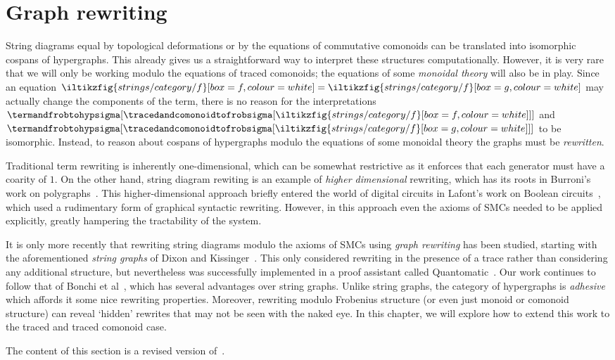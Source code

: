 \chapter{Graph rewriting}\label{chap:rewriting}

String diagrams equal by topological deformations or by the equations of
commutative comonoids can be translated into isomorphic cospans of hypergraphs.
This already gives us a straightforward way to interpret these structures
computationally.
However, it is very rare that we will only be working modulo the equations of
traced comonoids; the equations of some \emph{monoidal theory} will also be in
play.
Since an equation \(
\iltikzfig{strings/category/f}[box=f,colour=white]
=
\iltikzfig{strings/category/f}[box=g,colour=white]
\) may actually change the components of the term, there is no reason for the
interpretations \(
\termandfrobtohypsigma[
    \tracedandcomonoidtofrobsigma[
        \iltikzfig{strings/category/f}[box=f,colour=white]
    ]
]
\) and \(
\termandfrobtohypsigma[
    \tracedandcomonoidtofrobsigma[
        \iltikzfig{strings/category/f}[box=g,colour=white]
    ]
]
\) to be isomorphic.
Instead, to reason about cospans of hypergraphs modulo the equations of some
monoidal theory the graphs must be \emph{rewritten}.

Traditional term rewriting is inherently one-dimensional, which can be somewhat
restrictive as it enforces that each generator must have a coarity of \(1\).
On the other hand, string diagram rewiting is an example of
\emph{higher dimensional} rewriting, which has its roots in Burroni's work on
polygraphs~\cite{burroni1993higherdimensional}.
This higher-dimensional approach briefly entered the world of digital
circuits in Lafont's work on Boolean circuits~\cite{lafont2003algebraic}, which
used a rudimentary form of graphical syntactic rewriting.
However, in this approach even the axioms of SMCs needed to be applied
explicitly, greatly hampering the tractability of the system.

It is only more recently that rewriting string diagrams modulo the axioms of
SMCs using \emph{graph rewriting} has been studied, starting with the
aforementioned \emph{string graphs} of Dixon and
Kissinger~\cite{dixon2010open,kissinger2012pictures,dixon2013opengraphs}.
This only considered rewriting in the presence of a trace rather than
considering any additional structure, but nevertheless was successfully
implemented in a proof assistant called
Quantomatic~\cite{kissinger2015quantomatic}.
Our work continues to follow that of Bonchi et
al~\cite{bonchi2022string,bonchi2022stringa}, which has several advantages
over string graphs.
Unlike string graphs, the category of hypergraphs is
\emph{adhesive}~\cite{lack2004adhesive} which affords it some nice rewriting
properties.
Moreover, rewriting modulo Frobenius structure (or even just monoid or comonoid
structure) can reveal `hidden' rewrites that may not be seen with the naked eye.
In this chapter, we will explore how to extend this work to the traced and
traced comonoid case.

\begin{remark}
    The content of this section is a revised version
    of~\cite[Sec.\ 5]{ghica2023rewriting}.
\end{remark}




